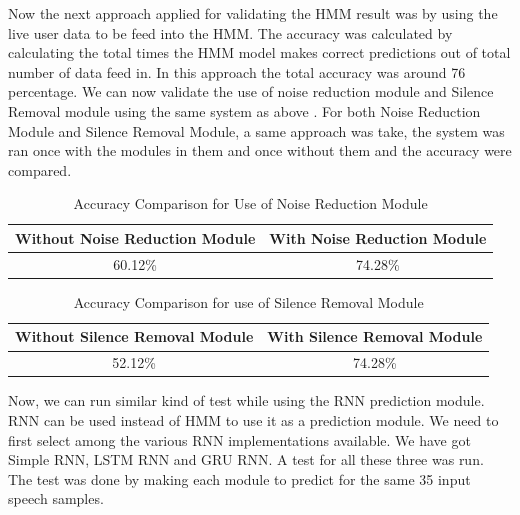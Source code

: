 Now the next approach applied for validating the HMM result was by using the live user data to be feed into the HMM. The accuracy was calculated by calculating the total times the HMM model makes correct predictions out of total number of data feed in. In this approach the total accuracy was around 76 percentage.
We can now validate the use of noise reduction module and Silence Removal module using the same system as above . For both Noise Reduction Module and Silence Removal Module, a same approach was take, the system was ran once with the modules in them and once without them and the accuracy were compared.

\begin{center}
	\begin {table}[h]
	\begin{center}
		
		\begin{tabular}{ |c|c| } 
			\hline
			\textbf{Without Noise Reduction Module} & \textbf{With Noise Reduction Module}  \\ 
			\hline
			60.12\% & 74.28\%  \\ 
			\hline
		
		\end{tabular}
		\caption{Accuracy Comparison for Use of Noise Reduction Module}
	\end{center}
\end{table}
\end{center}


\begin{center}
	\begin {table}[h]
	\begin{center}
		
		\begin{tabular}{ |c|c| } 
			\hline
			\textbf{Without Silence Removal Module} & \textbf{With Silence Removal Module}  \\ 
			\hline
			52.12\% & 74.28\%  \\ 
			\hline
			
		\end{tabular}
		\caption{Accuracy Comparison for use of Silence Removal Module}
	\end{center}
\end{table}
\end{center}

Now, we can run similar kind of test while using the RNN prediction module. RNN can be used instead of HMM to use it as a prediction module. We need to first select among the various RNN implementations available. We have got Simple RNN, LSTM RNN and GRU RNN. A test for all these three was run. The test was done by making each module to predict for the same 35 input speech samples.

